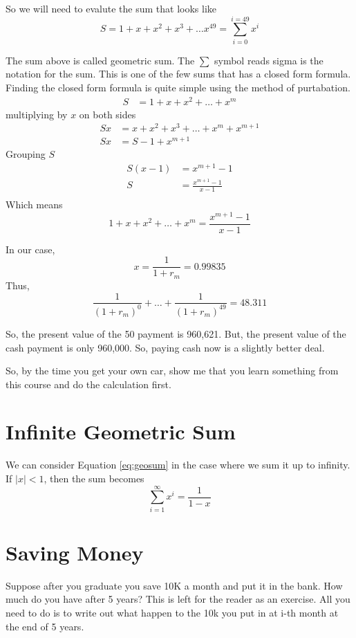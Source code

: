 \documentclass[a4paper, 12pt]{article}
\begin{document}
\begin{multicols}{2}
So we will need to evalute the sum that looks like
\[
S = 1 + x + x^2 + x^3 + \ldots x^{49} = \sum_{i=0}^{i=49} x^i
\]

The sum above is called geometric sum. The $\sum$ symbol reads sigma is the notation for the sum. This is one of the few sums that has a closed form formula. Finding the closed form formula is quite simple using the method of purtabation.
\begin{align*}
	S &= 1 + x + x^2 + \ldots + x^m
\end{align*}
multiplying by $x$ on both sides
\begin{align*}
	Sx &= x + x^2 + x^3 + \ldots + x^m + x^{m+1}\\
	Sx &= S-1 + x^{m+1}
\end{align*}
Grouping $S$
\begin{align*}
	S(x-1) &= x^{m+1} - 1\\
	S &= \frac{x^{m+1} - 1}{x-1}\\
\end{align*}
Which means
\begin{equation}
1 + x + x^2 + \ldots + x^m = \frac{x^{m+1} - 1}{x-1}
\label{eq:geosum}
\end{equation}

In our case,
\[
	x = \frac{1}{1+r_m} = 0.99835
\]
Thus,
\[
\frac{1}{(1+r_m)^{0}} +\ldots+ \frac{1}{(1+r_m)^{49}} = 48.311
\]

So, the present value of the 50 payment is 960,621. But, the present value of the cash payment is only 960,000. So, paying cash now is a slightly better deal.

So, by the time you get your own car, show me that you learn something from this course and do the calculation first.

\section*{Infinite Geometric Sum}

We can consider Equation \ref{eq:geosum} in the case where we sum it up to infinity. If $|x|<1$, then the sum becomes
\[
	\sum_{i=1}^{\infty}x^i = \frac{1}{1-x}
\]

\section*{Saving Money}
Suppose after you graduate you save 10K a month and put it in the bank. How much do you have after 5 years? This is left for the reader as an exercise. All you need to do is to write out what happen to the 10k you put in at i-th month at the end of 5 years.

\end{multicols}
\end{document}
